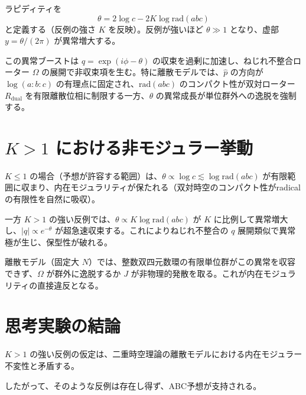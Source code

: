 \documentclass[dvipdfmx,a4paper]{article}
\begin{document}
ラピディティを
\[
\theta = 2 \log c - 2 K \log \mathrm{rad}(abc)
\]
と定義する（反例の強さ $K$ を反映）。反例が強いほど $\theta \gg 1$ となり、虚部 $y = \theta/(2\pi)$ が異常増大する。

この異常ブーストは $q = \exp(i \phi - \theta)$ の収束を過剰に加速し、ねじれ不整合ローター $\Omega$ の展開で非収束項を生む。特に離散モデルでは、$\hat{p}$ の方向が $\log(a:b:c)$ の有理点に固定され、$\mathrm{rad}(abc)$ のコンパクト性が双対ローター $R_\text{dual}$ を有限離散位相に制限する一方、$\theta$ の異常成長が単位群外への逸脱を強制する。

\section{$K > 1$ における非モジュラー挙動}

$K \leq 1$ の場合（予想が許容する範囲）は、$\theta \propto \log c \lesssim \log \mathrm{rad}(abc)$ が有限範囲に収まり、内在モジュラリティが保たれる（双対時空のコンパクト性がradicalの有限性を自然に吸収）。

一方 $K > 1$ の強い反例では、$\theta \propto K \log \mathrm{rad}(abc)$ が $K$ に比例して異常増大し、$|q| \propto e^{-\theta}$ が超急速収束する。これによりねじれ不整合の $q$ 展開類似で異常極が生じ、保型性が破れる。

離散モデル（固定大 $N$）では、整数双四元数環の有限単位群がこの異常を収容できず、$\Omega$ が群外に逸脱するか $J$ が非物理的発散を取る。これが内在モジュラリティの直接違反となる。

\section{思考実験の結論}

$K > 1$ の強い反例の仮定は、二重時空理論の離散モデルにおける内在モジュラー不変性と矛盾する。

したがって、そのような反例は存在し得ず、ABC予想が支持される。
\end{document}
